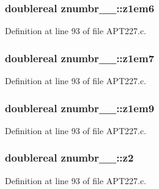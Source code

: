 \subsubsection[{\texorpdfstring{z1em6}{z1em6}}]{\setlength{\rightskip}{0pt plus 5cm}doublereal znumbr\+\_\+\_\+\+::z1em6}\hypertarget{structznumbr__1___af025ed31c05aed9c0f7934947199e949}{}\label{structznumbr__1___af025ed31c05aed9c0f7934947199e949}


Definition at line 93 of file A\+P\+T227.\+c.

\subsubsection[{\texorpdfstring{z1em7}{z1em7}}]{\setlength{\rightskip}{0pt plus 5cm}doublereal znumbr\+\_\+\_\+\+::z1em7}\hypertarget{structznumbr__1___a077de2d2a833f4fbc90b9073a0b45b81}{}\label{structznumbr__1___a077de2d2a833f4fbc90b9073a0b45b81}


Definition at line 93 of file A\+P\+T227.\+c.

\subsubsection[{\texorpdfstring{z1em9}{z1em9}}]{\setlength{\rightskip}{0pt plus 5cm}doublereal znumbr\+\_\+\_\+\+::z1em9}\hypertarget{structznumbr__1___aa0ba99d3473098e17785f2deab542751}{}\label{structznumbr__1___aa0ba99d3473098e17785f2deab542751}


Definition at line 93 of file A\+P\+T227.\+c.

\subsubsection[{\texorpdfstring{z2}{z2}}]{\setlength{\rightskip}{0pt plus 5cm}doublereal znumbr\+\_\+\_\+\+::z2}\hypertarget{structznumbr__1___aee28fd1dd7ff70cc6488cd683235bb1c}{}\label{structznumbr__1___aee28fd1dd7ff70cc6488cd683235bb1c}


Definition at line 93 of file A\+P\+T227.\+c.

